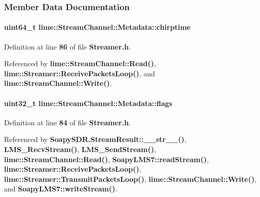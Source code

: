 \subsubsection{Member Data Documentation}
\paragraph[{chirptime}]{\setlength{\rightskip}{0pt plus 5cm}uint64\+\_\+t lime\+::\+Stream\+Channel\+::\+Metadata\+::chirptime}\label{structlime_1_1StreamChannel_1_1Metadata_aff9c69e31c958e03cd88732ce3bd01bd}


Definition at line {\bf 86} of file {\bf Streamer.\+h}.



Referenced by {\bf lime\+::\+Stream\+Channel\+::\+Read()}, {\bf lime\+::\+Streamer\+::\+Receive\+Packets\+Loop()}, and {\bf lime\+::\+Stream\+Channel\+::\+Write()}.

\paragraph[{flags}]{\setlength{\rightskip}{0pt plus 5cm}uint32\+\_\+t lime\+::\+Stream\+Channel\+::\+Metadata\+::flags}\label{structlime_1_1StreamChannel_1_1Metadata_addb1e0ead5437a4bfd9e4f2f1252246e}


Definition at line {\bf 84} of file {\bf Streamer.\+h}.



Referenced by {\bf Soapy\+S\+D\+R.\+Stream\+Result\+::\+\_\+\+\_\+str\+\_\+\+\_\+()}, {\bf L\+M\+S\+\_\+\+Recv\+Stream()}, {\bf L\+M\+S\+\_\+\+Send\+Stream()}, {\bf lime\+::\+Stream\+Channel\+::\+Read()}, {\bf Soapy\+L\+M\+S7\+::read\+Stream()}, {\bf lime\+::\+Streamer\+::\+Receive\+Packets\+Loop()}, {\bf lime\+::\+Streamer\+::\+Transmit\+Packets\+Loop()}, {\bf lime\+::\+Stream\+Channel\+::\+Write()}, and {\bf Soapy\+L\+M\+S7\+::write\+Stream()}.

